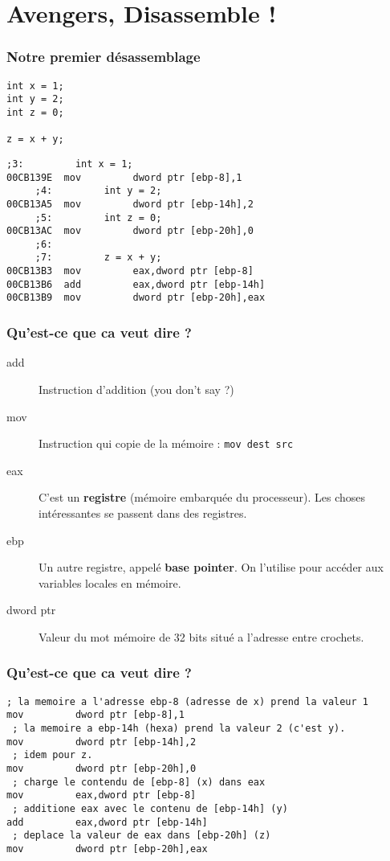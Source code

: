 \documentclass{beamer}
\begin{document}
\section{Avengers, Disassemble !}
\begin{frame}[fragile]
  \frametitle{Notre premier désassemblage}

    \begin{lstlisting}
int x = 1;
int y = 2;
int z = 0;

z = x + y;
    \end{lstlisting}
\pause
    \begin{lstlisting}[language={[x86masm]Assembler}]
     ;3:         int x = 1;
00CB139E  mov         dword ptr [ebp-8],1  
     ;4:         int y = 2;
00CB13A5  mov         dword ptr [ebp-14h],2  
     ;5:         int z = 0;
00CB13AC  mov         dword ptr [ebp-20h],0  
     ;6: 
     ;7:         z = x + y;
00CB13B3  mov         eax,dword ptr [ebp-8]  
00CB13B6  add         eax,dword ptr [ebp-14h]  
00CB13B9  mov         dword ptr [ebp-20h],eax  
    \end{lstlisting}

\end{frame}
\begin{frame} [fragile]
\frametitle{Qu'est-ce que ca veut dire ?}
\begin{description}
\item[add] Instruction d'addition (you don't say ?)
\item[mov] Instruction qui copie de la mémoire : \lstinline[language={[x86masm]Assembler}]+mov dest src+
\item[eax] C'est un \textbf{registre} (mémoire embarquée du processeur). Les choses intéressantes se passent dans des registres.
\item[ebp] Un autre registre, appelé \textbf{base pointer}. On l'utilise pour accéder aux variables locales en mémoire.
\item[dword ptr] Valeur du mot mémoire de 32 bits situé a l'adresse entre crochets.
\end{description}
\end{frame}

\begin{frame} [fragile]
\frametitle{Qu'est-ce que ca veut dire ?}
    \begin{lstlisting}[language={[x86masm]Assembler}]
 ; la memoire a l'adresse ebp-8 (adresse de x) prend la valeur 1
mov         dword ptr [ebp-8],1
 ; la memoire a ebp-14h (hexa) prend la valeur 2 (c'est y).
mov         dword ptr [ebp-14h],2
 ; idem pour z. 
mov         dword ptr [ebp-20h],0
 ; charge le contendu de [ebp-8] (x) dans eax 
mov         eax,dword ptr [ebp-8]
 ; additione eax avec le contenu de [ebp-14h] (y)
add         eax,dword ptr [ebp-14h]
 ; deplace la valeur de eax dans [ebp-20h] (z)
mov         dword ptr [ebp-20h],eax
    \end{lstlisting}
\end{frame}
\end{document}
